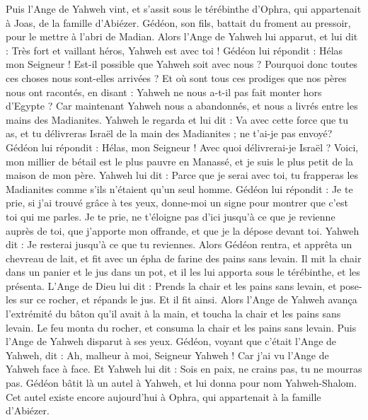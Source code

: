 \begin{multicols}{2}
Puis l'Ange de Yahweh vint, et s'assit sous le térébinthe d’Ophra, qui appartenait à Joas, de la famille d'Abiézer. Gédéon, son fils, battait du froment au pressoir, pour le mettre à l'abri de Madian.
Alors l'Ange de Yahweh lui apparut, et lui dit : Très fort et vaillant héros, Yahweh est avec toi !
Gédéon lui répondit : Hélas mon Seigneur ! Est-il possible que Yahweh soit avec nous ? Pourquoi donc toutes ces choses nous sont-elles arrivées ? Et où sont tous ces prodiges que nos pères nous ont racontés, en disant : Yahweh ne nous a-t-il pas fait monter hors d'Egypte ? Car maintenant Yahweh nous a abandonnés, et nous a livrés entre les mains des Madianites.
Yahweh le regarda et lui dit : Va avec cette force que tu as, et tu délivreras Israël de la main des Madianites ; ne t'ai-je pas envoyé?
Gédéon lui répondit : Hélas, mon Seigneur ! Avec quoi délivrerai-je Israël ? Voici, mon millier de bétail est le plus pauvre en Manassé, et je suis le plus petit de la maison de mon père.
Yahweh lui dit : Parce que je serai avec toi, tu frapperas les Madianites comme s'ils n'étaient qu'un seul homme.
Gédéon lui répondit : Je te prie, si j'ai trouvé grâce à tes yeux, donne-moi un signe pour montrer que c'est toi qui me parles.
Je te prie, ne t’éloigne pas d’ici jusqu'à ce que je revienne auprès de toi, que j'apporte mon offrande, et que je la dépose devant toi. Yahweh dit : Je resterai jusqu'à ce que tu reviennes.
Alors Gédéon rentra, et apprêta un chevreau de lait, et fit avec un épha de farine des pains sans levain. Il mit la chair dans un panier et le jus dans un pot, et il les lui apporta sous le térébinthe, et les présenta.
L'Ange de Dieu lui dit : Prends la chair et les pains sans levain, et pose-les sur ce rocher, et répands le jus. Et il fit ainsi.
Alors l'Ange de Yahweh avança l’extrémité du bâton qu'il avait à la main, et toucha la chair et les pains sans levain. Le feu monta du rocher, et consuma la chair et les pains sans levain. Puis l'Ange de Yahweh disparut à ses yeux.
Gédéon, voyant que c'était l'Ange de Yahweh, dit : Ah, malheur à moi, Seigneur Yahweh ! Car j'ai vu l’Ange de Yahweh face à face.
Et Yahweh lui dit : Sois en paix, ne crains pas, tu ne mourras pas.
Gédéon bâtit là un autel à Yahweh, et lui donna pour nom Yahweh-Shalom. Cet autel existe encore aujourd'hui à Ophra, qui appartenait à la famille d'Abiézer.

\end{multicols}
